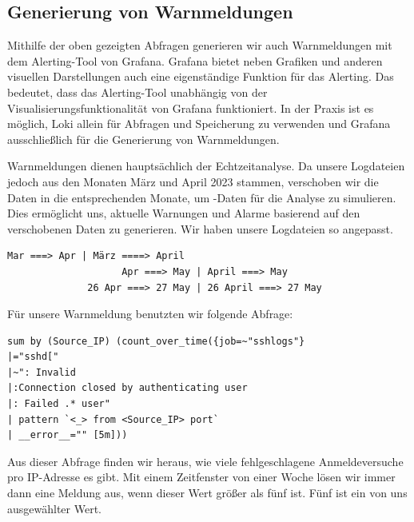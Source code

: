 
\subsection{Generierung von Warnmeldungen}

Mithilfe der oben gezeigten Abfragen generieren wir auch Warnmeldungen mit dem Alerting-Tool von Grafana. Grafana bietet neben Grafiken und anderen visuellen Darstellungen auch eine eigenständige Funktion für das Alerting. Das bedeutet, dass das Alerting-Tool unabhängig von der Visualisierungsfunktionalität von Grafana funktioniert. In der Praxis ist es möglich, Loki allein für Abfragen und Speicherung zu verwenden und Grafana ausschließlich für die Generierung von Warnmeldungen.

Warnmeldungen dienen hauptsächlich der Echtzeitanalyse. Da unsere Logdateien jedoch aus den Monaten März und April 2023 stammen, verschoben wir die Daten in die entsprechenden Monate, um -Daten für die Analyse zu simulieren. Dies ermöglicht uns, aktuelle Warnungen und Alarme basierend auf den verschobenen Daten zu generieren. Wir haben unsere Logdateien so angepasst.

\begin{center}
{
\begin{Verbatim}[frame=single]
                    Mar ===> Apr | März ====> April
                    Apr ===> May | April ===> May
              26 Apr ===> 27 May | 26 April ===> 27 May
\end{Verbatim}
}
\end{center}

Für unsere Warnmeldung benutzten wir folgende Abfrage:
\begin{center}
{
\begin{Verbatim}[frame=single]
sum by (Source_IP) (count_over_time({job=~"sshlogs"} 
|="sshd[" 
|~": Invalid
|:Connection closed by authenticating user
|: Failed .* user" 
| pattern `<_> from <Source_IP> port` 
| __error__="" [5m]))
\end{Verbatim}
}
\end{center}

Aus dieser Abfrage finden wir heraus, wie viele fehlgeschlagene Anmeldeversuche pro IP-Adresse es gibt. Mit einem Zeitfenster von einer Woche lösen wir immer dann eine Meldung aus, wenn dieser Wert größer als fünf ist. Fünf ist ein von uns ausgewählter Wert. 

